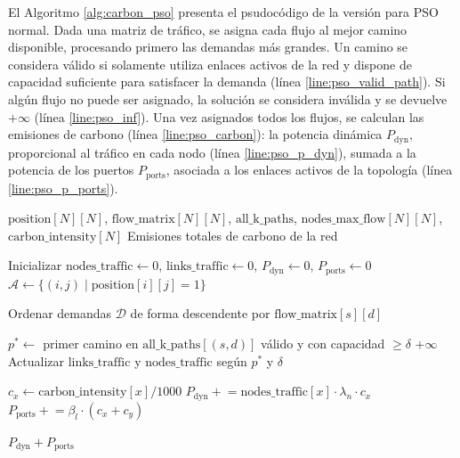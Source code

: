 El Algoritmo \ref{alg:carbon_pso} presenta el psudocódigo de la versión para PSO normal. Dada una matriz de tráfico, se asigna cada flujo al mejor camino disponible, procesando primero las demandas más grandes. Un camino se considera válido si solamente utiliza enlaces activos de la red y dispone de capacidad suficiente para satisfacer la demanda (línea \ref{line:pso_valid_path}). Si algún flujo no puede ser asignado, la solución se considera inválida y se devuelve $+\infty$ (línea \ref{line:pso_inf}). Una vez asignados todos los flujos, se calculan las emisiones de carbono (línea \ref{line:pso_carbon}): la potencia dinámica $P_{\text{dyn}}$, proporcional al tráfico en cada nodo (línea \ref{line:pso_p_dyn}), sumada a la potencia de los puertos $P_{\text{ports}}$, asociada a los enlaces activos de la topología (línea \ref{line:pso_p_ports}).

\begin{algorithm}[H]
    \caption{Cálculo de la emisiones totales de la red para PSO normal}
    \label{alg:carbon_pso}
    \begin{algorithmic}[1]
    \Require $\text{position}[N][N]$, $\text{flow\_matrix}[N][N]$, $\text{all\_k\_paths}$, $\text{nodes\_max\_flow}[N][N]$, $\text{carbon\_intensity}[N]$
    \Ensure Emisiones totales de carbono de la red
    
    \State Inicializar $\text{nodes\_traffic} \leftarrow 0$, $\text{links\_traffic} \leftarrow 0$, $P_{\text{dyn}} \leftarrow 0$, $P_{\text{ports}} \leftarrow 0$
    \State $\mathcal{A} \leftarrow \{(i,j) \mid \text{position}[i][j] = 1\}$
    
    \State Ordenar demandas $\mathcal{D}$ de forma descendente por $\text{flow\_matrix}[s][d]$
    
        \State $p^* \leftarrow$ primer camino en $\text{all\_k\_paths}[(s,d)]$ válido y con capacidad $\geq \delta$ \label{line:pso_valid_path}
         \Return $+\infty$ \label{line:pso_inf} \EndIf
        \State Actualizar $\text{links\_traffic}$ y $\text{nodes\_traffic}$ según $p^*$ y $\delta$
    \EndFor
    
        \State $c_x \leftarrow \text{carbon\_intensity}[x] / 1000$
        \State $P_{\text{dyn}} \mathrel{+}= \text{nodes\_traffic}[x] \cdot \lambda_n \cdot c_x$ \label{line:pso_p_dyn}
            \State $P_{\text{ports}} \mathrel{+}= \beta_l \cdot (c_x + c_y)$ \label{line:pso_p_ports}
        \EndFor
    \EndFor
    
    \State \Return $P_{\text{dyn}} + P_{\text{ports}}$ \label{line:pso_carbon}
    \end{algorithmic}
\end{algorithm}

